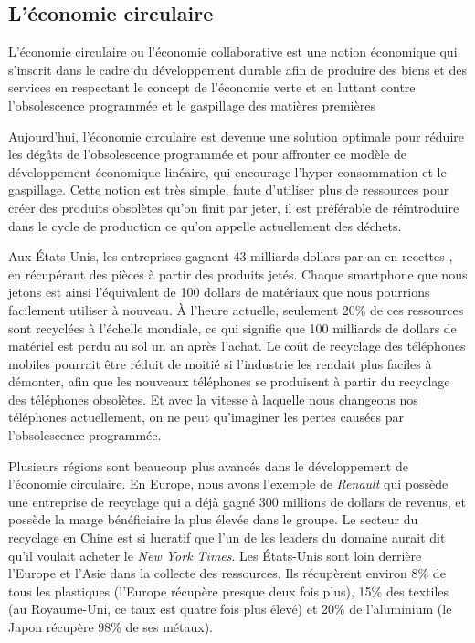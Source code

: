 \subsection{L'économie circulaire}


\bigbreak
L’économie circulaire ou l’économie collaborative est une notion économique qui s'inscrit dans le cadre du développement durable afin de produire des biens et des services en respectant le concept de l'économie verte et en luttant contre l'obsolescence programmée et le gaspillage des matières premières %


\bigbreak
Aujourd'hui, l'économie circulaire est devenue une solution optimale pour réduire les dégâts de l'obsolescence programmée et pour affronter ce modèle de développement économique linéaire, qui encourage l’hyper-consommation et le gaspillage. Cette notion est très simple, faute d'utiliser plus de ressources pour créer des produits obsolètes qu'on finit par jeter, il est préférable de réintroduire dans le cycle de production ce qu'on appelle actuellement des déchets.


\bigbreak
Aux États-Unis, les entreprises gagnent 43 milliards dollars par an en recettes \cite{usatoday}, en récupérant des pièces à partir des produits jetés. Chaque smartphone que nous jetons est ainsi l'équivalent de 100 dollars de matériaux que nous pourrions facilement utiliser à nouveau. À l'heure actuelle, seulement 20\% de ces ressources sont recyclées à l'échelle mondiale, ce qui signifie que 100 milliards de dollars de matériel est perdu au sol un an après l'achat. Le coût de recyclage des téléphones mobiles pourrait être réduit de moitié si l'industrie les rendait plus faciles à démonter, afin que les nouveaux téléphones se produisent à partir du recyclage des téléphones obsolètes. Et avec la vitesse à laquelle nous changeons nos téléphones actuellement, on ne peut qu'imaginer les pertes causées par l'obsolescence programmée.


\bigbreak
Plusieurs régions sont beaucoup plus avancés dans le développement de l'économie circulaire. En Europe, nous avons l'exemple de \textit{Renault} qui possède une entreprise de recyclage qui a déjà gagné 300 millions de dollars de revenus, et possède la marge bénéficiaire la plus élevée dans le groupe. Le secteur du recyclage en Chine est si lucratif que l'un de les leaders du domaine aurait dit qu'il voulait acheter le \textit{New York Times}. Les États-Unis sont loin derrière l'Europe et l'Asie dans la collecte des ressources. Ils récupèrent environ 8\% de tous les plastiques (l'Europe récupère presque deux fois plus), 15\% des textiles (au Royaume-Uni, ce taux est quatre fois plus élevé) et 20\% de l'aluminium (le Japon récupère 98\% de ses métaux).

